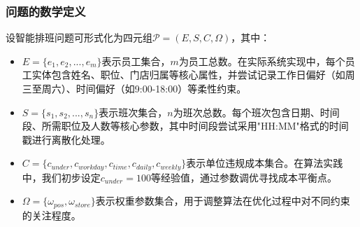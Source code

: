 \documentclass{ctexart}
\begin{document}
    
    


\subsubsection{问题的数学定义}
设智能排班问题可形式化为四元组$\mathcal{P}=(E, S, C, \Omega)$，其中：
\begin{itemize}
    \item $E = \{e_1,e_2,...,e_m\}$表示员工集合，$m$为员工总数。在实际系统实现中，每个员工实体包含姓名、职位、门店归属等核心属性，并尝试记录工作日偏好（如周三至周六）、时间偏好（如9:00-18:00）等柔性约束。
    \item $S = \{s_1,s_2,...,s_n\}$表示班次集合，$n$为班次总数。每个班次包含日期、时间段、所需职位及人数等核心参数，其中时间段尝试采用"HH:MM"格式的时间戳进行离散化处理。
    \item $C = \{c_{under},c_{workday},c_{time},c_{daily},c_{weekly}\}$表示单位违规成本集合。在算法实践中，我们初步设定$c_{under}=100$等经验值，通过参数调优寻找成本平衡点。
    \item $\Omega = \{\omega_{pos}, \omega_{store}\}$表示权重参数集合，用于调整算法在优化过程中对不同约束的关注程度。
\end{itemize}
\end{document}
